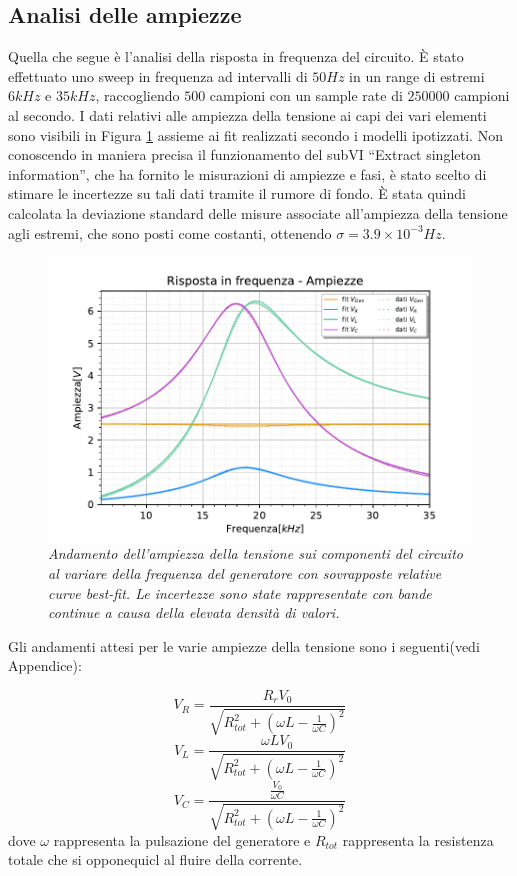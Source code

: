 \subsection{Analisi delle ampiezze}

Quella che segue è l'analisi della risposta in frequenza del circuito.
È stato effettuato uno sweep in frequenza ad intervalli di $50Hz$ in un range di estremi $6kHz$ e $35kHz$, raccogliendo
$500$ campioni con un sample rate di $250000$ campioni al secondo.
I dati relativi alle ampiezza della tensione ai capi dei vari elementi sono visibili in Figura \ref{fig:ampiezzeRLC}
assieme ai fit realizzati secondo i modelli ipotizzati.
Non conoscendo in maniera precisa il funzionamento del subVI ``Extract singleton information'', che ha fornito le misurazioni
di ampiezze e fasi, è stato scelto di stimare le incertezze su tali dati tramite il rumore di fondo. È stata quindi
calcolata la deviazione standard delle misure associate all’ampiezza della tensione agli estremi, che sono posti
come costanti, ottenendo $\sigma = 3.9 \times 10^{-3} Hz$.
\begin{figure}[h]
    \centering
    \includegraphics[width=.8\textwidth]{../figs/Risposta-in-frequenza-ampiezze.pdf}
    \caption{\emph{Andamento dell’ampiezza della tensione sui componenti del circuito al variare
    della frequenza del generatore con sovrapposte relative curve best-fit. Le incertezze sono state
    rappresentate con bande continue a causa della elevata densità di valori.}}
    \label{fig:ampiezzeRLC}
\end{figure}

Gli andamenti attesi per le varie ampiezze della tensione sono i seguenti(vedi Appendice):

\begin{equation}\label{eq:amp-V_R}
    V_R = \frac{R_rV_0}{\sqrt{ R_{tot}^2 +{ \left(\omega L - \frac{1}{\omega C}\right)}^2}}
\end{equation}
\begin{equation}
    V_L = \frac{\omega L V_0}{\sqrt{R_{tot}^2+{ \left(\omega L - \frac{1}{\omega C}\right)}^2}}
\end{equation}
\begin{equation}
    V_C = \frac{\frac{V_0}{\omega C}}{\sqrt{R_{tot}^2+{ \left(\omega L - \frac{1}{\omega C}\right)}^2}}
\end{equation}
dove $\omega$ rappresenta la pulsazione del generatore e $R_{tot}$ rappresenta la resistenza totale che si opponequicl al
fluire della corrente.



